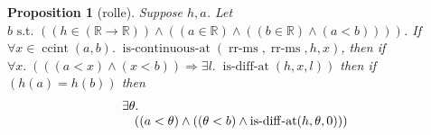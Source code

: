 \documentclass[11pt]{article}
\theoremstyle{plain}
\newtheorem{proposition}{Proposition}
\begin{document}
\begin{proposition}[rolle]
Suppose $h, a$. Let $b \text{ s.t. } ((h \in (\mathbb{R} \to \mathbb{R})) \wedge ((a \in \mathbb{R}) \wedge ((b \in \mathbb{R}) \wedge (a < b))))$. If $\forall x \in \operatorname{ccint}(a, b).\; \operatorname{is\text{-}continuous\text{-}at}(\operatorname{rr\text{-}ms}, \operatorname{rr\text{-}ms}, h, x)$, then if $\forall x.\; (((a < x) \wedge (x < b)) \Rightarrow \exists l.\; \operatorname{is\text{-}diff\text{-}at}(h, x, l))$ then if $(h(a) = h(b))$ then 
\begin{equation*}
\begin{array}{@{}l@{}} \exists \theta. \\ \quad ((a < \theta) \wedge ((\theta < b) \wedge \operatorname{is\text{-}diff\text{-}at}(h, \theta, 0))) \end{array}
\end{equation*}

\end{proposition}
\end{document}
